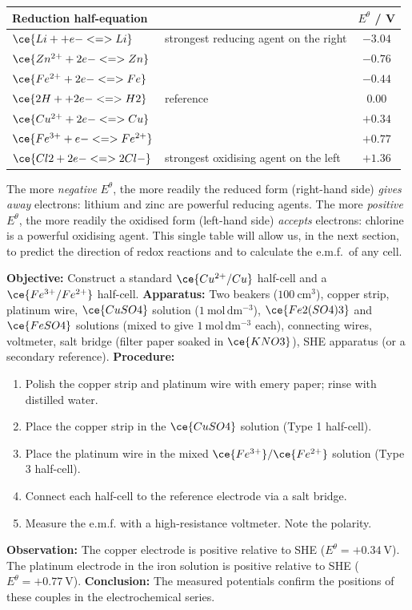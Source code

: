 \documentclass[11pt]{article}
\begin{document}
\begin{center}
\begin{tabularx}{\linewidth}{|l|X|c|}
\hline
\rowcolor{popblueL} Reduction half-equation & & $E^{\theta}$ / V \\
\hline
$\ce{Li+ + e- <=> Li}$ & strongest reducing agent on the right & $-3.04$ \\
\hline
$\ce{Zn^{2+} + 2e- <=> Zn}$ & & $-0.76$ \\
\hline
$\ce{Fe^{2+} + 2e- <=> Fe}$ & & $-0.44$ \\
\hline
$\ce{2H+ + 2e- <=> H2}$ & reference & $0.00$ \\
\hline
$\ce{Cu^{2+} + 2e- <=> Cu}$ & & $+0.34$ \\
\hline
$\ce{Fe^{3+} + e- <=> Fe^{2+}}$ & & $+0.77$ \\
\hline
$\ce{Cl2 + 2e- <=> 2Cl-}$ & strongest oxidising agent on the left & $+1.36$ \\
\hline
\end{tabularx}
\end{center}

The more \emph{negative} $E^{\theta}$, the more readily the reduced form (right-hand side) \emph{gives away} electrons: lithium and zinc are powerful reducing agents. The more \emph{positive} $E^{\theta}$, the more readily the oxidised form (left-hand side) \emph{accepts} electrons: chlorine is a powerful oxidising agent. This single table will allow us, in the next section, to predict the direction of redox reactions and to calculate the e.m.f.\ of any cell.

\begin{experience}
\textbf{Objective:} Construct a standard $\ce{Cu^{2+}/Cu}$ half-cell and a $\ce{Fe^{3+}/Fe^{2+}}$ half-cell.
\textbf{Apparatus:} Two beakers ($100\ \mathrm{cm^3}$), copper strip, platinum wire, $\ce{CuSO4}$ solution ($1\ \mathrm{mol\,dm^{-3}}$), $\ce{Fe2(SO4)3}$ and $\ce{FeSO4}$ solutions (mixed to give $1\ \mathrm{mol\,dm^{-3}}$ each), connecting wires, voltmeter, salt bridge (filter paper soaked in $\ce{KNO3}$), SHE apparatus (or a secondary reference).
\textbf{Procedure:}
\begin{enumerate}
\item Polish the copper strip and platinum wire with emery paper; rinse with distilled water.
\item Place the copper strip in the $\ce{CuSO4}$ solution (Type 1 half-cell).
\item Place the platinum wire in the mixed $\ce{Fe^{3+}}/\ce{Fe^{2+}}$ solution (Type 3 half-cell).
\item Connect each half-cell to the reference electrode via a salt bridge.
\item Measure the e.m.f. with a high-resistance voltmeter. Note the polarity.
\end{enumerate}
\textbf{Observation:} The copper electrode is positive relative to SHE ($E^{\theta} = +0.34\ \mathrm{V}$). The platinum electrode in the iron solution is positive relative to SHE ($E^{\theta} = +0.77\ \mathrm{V}$).
\textbf{Conclusion:} The measured potentials confirm the positions of these couples in the electrochemical series.
\end{experience}
\end{document}

